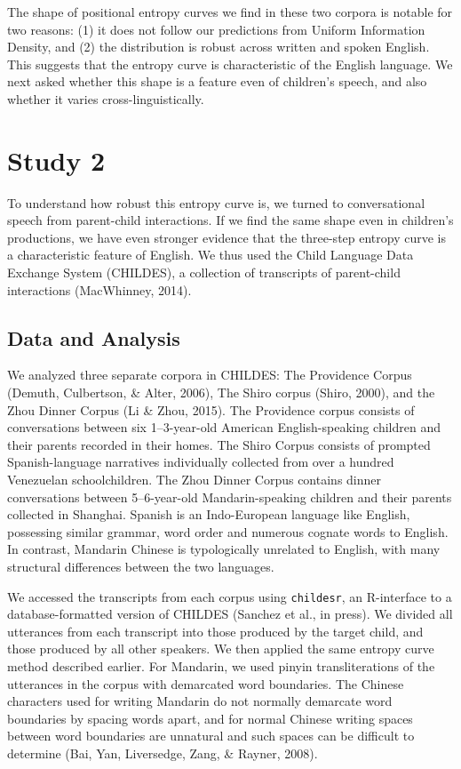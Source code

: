 \documentclass[10pt, letterpaper]{article}
\begin{document}
The shape of positional entropy curves we find in these two corpora is
notable for two reasons: (1) it does not follow our predictions from
Uniform Information Density, and (2) the distribution is robust across
written and spoken English. This suggests that the entropy curve is
characteristic of the English language. We next asked whether this shape
is a feature even of children's speech, and also whether it varies
cross-linguistically.

\hypertarget{study-2}{%
\section{Study 2}\label{study-2}}

To understand how robust this entropy curve is, we turned to
conversational speech from parent-child interactions. If we find the
same shape even in children's productions, we have even stronger
evidence that the three-step entropy curve is a characteristic feature
of English. We thus used the Child Language Data Exchange System
(CHILDES), a collection of transcripts of parent-child interactions
(MacWhinney, 2014).

\hypertarget{data-and-analysis-1}{%
\subsection{Data and Analysis}\label{data-and-analysis-1}}

We analyzed three separate corpora in CHILDES: The Providence Corpus
(Demuth, Culbertson, \& Alter, 2006), The Shiro corpus (Shiro, 2000),
and the Zhou Dinner Corpus (Li \& Zhou, 2015). The Providence corpus
consists of conversations between six 1--3-year-old American
English-speaking children and their parents recorded in their homes. The
Shiro Corpus consists of prompted Spanish-language narratives
individually collected from over a hundred Venezuelan schoolchildren.
The Zhou Dinner Corpus contains dinner conversations between
5--6-year-old Mandarin-speaking children and their parents collected in
Shanghai. Spanish is an Indo-European language like English, possessing
similar grammar, word order and numerous cognate words to English. In
contrast, Mandarin Chinese is typologically unrelated to English, with
many structural differences between the two languages.

We accessed the transcripts from each corpus using \texttt{childesr}, an
R-interface to a database-formatted version of CHILDES (Sanchez et al.,
in press). We divided all utterances from each transcript into those
produced by the target child, and those produced by all other speakers.
We then applied the same entropy curve method described earlier. For
Mandarin, we used pinyin transliterations of the utterances in the
corpus with demarcated word boundaries. The Chinese characters used for
writing Mandarin do not normally demarcate word boundaries by spacing
words apart, and for normal Chinese writing spaces between word
boundaries are unnatural and such spaces can be difficult to determine
(Bai, Yan, Liversedge, Zang, \& Rayner, 2008).
\end{document}

